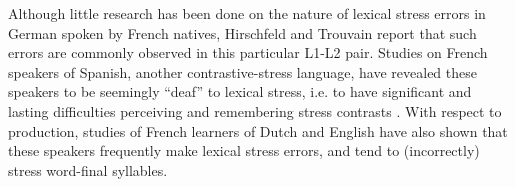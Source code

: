 \documentclass[a4paper]{article}
\begin{document}
Although little research has been done on the nature of lexical stress errors in German spoken by French natives, Hirschfeld and Trouvain \cite{Hirschfeld2007} report that such errors are commonly observed in this particular L1-L2 pair.
Studies on French speakers of Spanish, another contrastive-stress language, have revealed these speakers to be seemingly ``deaf'' to lexical stress, i.e. to have significant and lasting difficulties 
perceiving and remembering 
stress contrasts \cite{Dupoux1997}. 
With respect to production, 
studies of French learners of Dutch \cite{Michaux2013} and English \cite{Bonneau2011} have also shown that these speakers frequently make lexical stress errors, and tend to (incorrectly) stress word-final syllables. %
%
	
\end{document}
